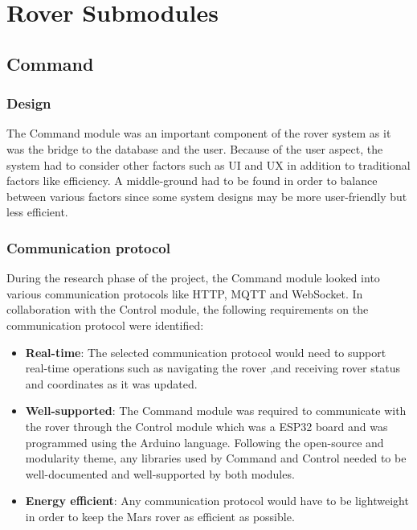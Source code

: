 \documentclass[11pt, a4paper]{article}
\begin{document}
\pagebreak



\pagebreak
\section{Rover Submodules}

\subsection{Command}

\subsubsection{Design}

The Command module was an important component of the rover system as it was the bridge to the database and the user. Because of the user aspect, the system had to consider other factors such as UI and UX in addition to traditional factors like efficiency. A middle-ground had to be found in order to balance between various factors since some system designs may be more user-friendly but less efficient. 

\subsubsection{Communication protocol}

During the research phase of the project, the Command module looked into various communication protocols like HTTP, MQTT and WebSocket. In collaboration with the Control module, the following requirements on the communication protocol were identified:
\begin{itemize}
    \item \textbf{Real-time}: The selected communication protocol would need to support real-time operations such as navigating the rover ,and receiving rover status and coordinates as it was updated. 
      
    \item \textbf{Well-supported}: The Command module was required to communicate with the rover through the Control module which was a ESP32 board and was programmed using the Arduino language. Following the open-source and modularity theme, any libraries used by Command and Control needed to be well-documented and well-supported by both modules. 
    
    \item \textbf{Energy efficient}: Any communication protocol would have to be lightweight in order to keep the Mars rover as efficient as possible.
\end{itemize} 
\end{document}
